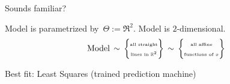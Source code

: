 \begin{frame}{\Large Sounds familiar?\quad{}}
\begin{multicols}{2}
\begin{flushright}
\begin{minipage}{4.5cm}
	\pause
	\begin{center}
	Model is parametrized by \,$\Theta := \Re^{2}$.
	\vskip 0.1cm
	Model is $2$-dimensional.
	\pause
	\begin{equation*}
	\textnormal{Model}
	\,\sim\,
	\left\{\!\!\!\begin{array}{c}
	\textnormal{\tiny all straight} \\ \textnormal{\tiny lines in $\Re^{2}$}
	\end{array}\!\!\!\right\}
	\,\sim\,
	\left\{\!\!\!\begin{array}{c}
	\textnormal{\tiny all affine} \\ \textnormal{\tiny functions of $x$}
	\end{array}\!\!\!\right\}
	\end{equation*}
	\end{center}

	\pause\pause\pause
	\begin{center}
	\vskip 0.5cm
	{\large Best fit: Least Squares}
	\vskip 0.2cm
	\pause
	{\small(trained prediction machine)}
	\end{center}

	\end{minipage}
	\end{flushright}

\end{multicols}

\end{frame}
\normalsize

